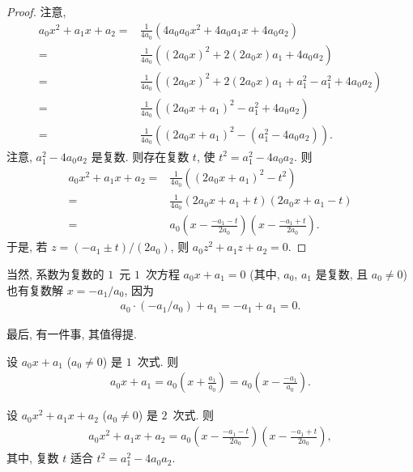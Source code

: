 \documentclass[../libro.tex]{subfiles}
\begin{document}
\begin{proof}
    注意,
    \begin{align*}
        a_0 x^2 + a_1 x + a_2
        = {} &
        \frac{1}{4a_0} (4 a_0 a_0 x^2 + 4 a_0 a_1 x + 4 a_0 a_2)
        \\
        = {} &
        \frac{1}{4a_0} ((2 a_0 x)^2 + 2 (2 a_0 x) a_1 + 4 a_0 a_2)
        \\
        = {} &
        \frac{1}{4a_0} ((2 a_0 x)^2 + 2 (2 a_0 x) a_1 + a_1^2 - a_1^2 + 4 a_0 a_2)
        \\
        = {} &
        \frac{1}{4a_0} ((2 a_0 x + a_1)^2 - a_1^2 + 4 a_0 a_2)
        \\
        = {} &
        \frac{1}{4a_0} ((2 a_0 x + a_1)^2 - (a_1^2 - 4 a_0 a_2)).
    \end{align*}
    注意, \(a_1^2 - 4 a_0 a_2\) 是复数.
    则存在复数 \(t\), 使 \(t^2 = a_1^2 - 4 a_0 a_2\).
    则
    \begin{align*}
        a_0 x^2 + a_1 x + a_2
        = {} &
        \frac{1}{4a_0} ((2 a_0 x + a_1)^2 - t^2)
        \\
        = {} &
        \frac{1}{4a_0} (2 a_0 x + a_1 + t) (2 a_0 x + a_1 - t)
        \\
        = {} &
        a_0
        \left( x - \frac{-a_1 - t}{2 a_0} \right)
        \left( x - \frac{-a_1 + t}{2 a_0} \right).
    \end{align*}
    于是, 若 \(z = (-a_1 \pm t) / (2 a_0)\),
    则 \(a_0 z^2 + a_1 z + a_2 = 0\).
\end{proof}

当然, 系数为复数的 \(1\)~元 \(1\)~次方程
\(a_0 x + a_1 = 0\)
(其中, \(a_0\), \(a_1\) 是复数,
且 \(a_0 \neq 0\))
也有复数解 \(x = -a_1 / a_0\),
因为
\begin{align*}
    a_0 \cdot (-a_1 / a_0) + a_1
    = -a_1 + a_1 = 0.
\end{align*}

最后, 有一件事, 其值得提.

设 \(a_0 x + a_1\) (\(a_0 \neq 0\)) 是 \(1\)~次式.
则
\begin{align*}
    a_0 x + a_1
    = a_0 \left(x + \frac{a_1}{a_0}\right)
    = a_0 \left(x - \frac{-a_1}{a_0}\right).
\end{align*}

设 \(a_0 x^2 + a_1 x + a_2\) (\(a_0 \neq 0\))
是 \(2\)~次式.
则
\begin{align*}
    a_0 x^2 + a_1 x + a_2
    = a_0
    \left( x - \frac{-a_1 - t}{2 a_0} \right)
    \left( x - \frac{-a_1 + t}{2 a_0} \right),
\end{align*}
其中, 复数 \(t\) 适合 \(t^2 = a_1^2 - 4 a_0 a_2\).
\end{document}
